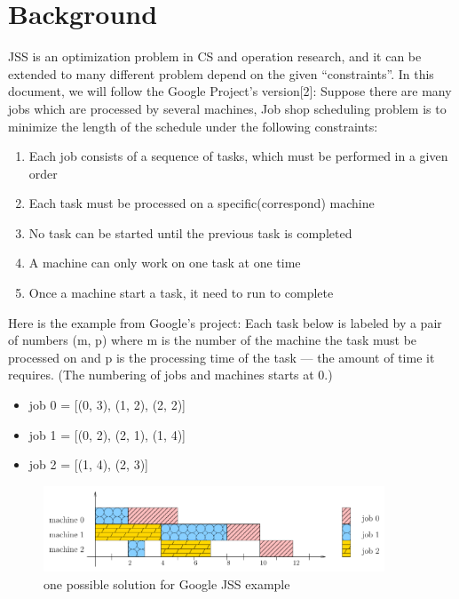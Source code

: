 \section*{Background}
JSS is an optimization problem in CS and operation research, and it can be extended to many different problem depend on the given “constraints”. In this document, we will follow the Google Project’s version[2]: Suppose there are many jobs which are processed by several machines, Job shop scheduling problem is to minimize the length of the schedule under the following constraints:

\begin{enumerate}
 \item Each job consists of a sequence of tasks, which must be performed in a given order

  \item Each task must be processed on a specific(correspond) machine

   \item No task can be started until the previous task is completed

    \item A machine can only work on one task at one time

     \item Once a machine start a task, it need to run to complete


\end{enumerate}
Here is the example from Google’s project: Each task below is labeled by a pair of numbers (m, p) where m is the number of the machine the task must be processed on and p is the processing time of the task — the amount of time it requires. (The numbering of jobs and machines starts at 0.)
\begin{itemize}
\item job 0 = [(0, 3), (1, 2), (2, 2)]
\item job 1 = [(0, 2), (2, 1), (1, 4)]
\item job 2 = [(1, 4), (2, 3)]
\end{itemize}

\begin{figure}[H]
\centering
\includegraphics[width=4in]{img/1.PNG}
\caption{one possible solution for Google JSS example}
\end{figure}